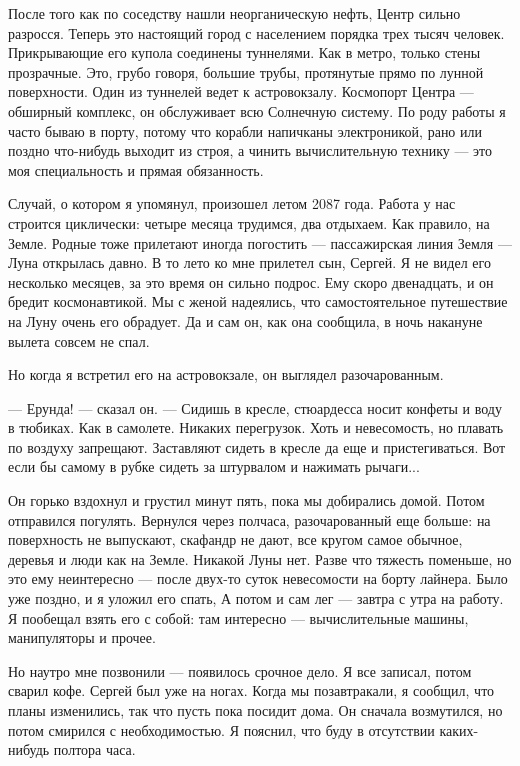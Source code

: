 \documentclass[11pt,a4paper,oneside]{article}
\begin{document}
После того как по соседству нашли неорганическую нефть, Центр сильно разросся. Теперь это настоящий город с населением порядка трех тысяч человек. Прикрывающие его купола соединены туннелями. Как в метро, только стены прозрачные. Это, грубо говоря, большие трубы, протянутые прямо по лунной поверхности. Один из туннелей ведет к астровокзалу. Космопорт Центра — обширный комплекс, он обслуживает всю Солнечную систему. По роду работы я часто бываю в порту, потому что корабли напичканы электроникой, рано или поздно что-нибудь выходит из строя, а чинить вычислительную технику — это моя специальность и прямая обязанность.

Случай, о котором я упомянул, произошел летом 2087 года. Работа у нас строится циклически: четыре месяца трудимся, два отдыхаем. Как правило, на Земле. Родные тоже прилетают иногда погостить — пассажирская линия Земля — Луна открылась давно. В то лето ко мне прилетел сын, Сергей. Я не видел его несколько месяцев, за это время он сильно подрос. Ему скоро двенадцать, и он бредит космонавтикой. Мы с женой надеялись, что самостоятельное путешествие на Луну очень его обрадует. Да и сам он, как она сообщила, в ночь накануне вылета совсем не спал.

Но когда я встретил его на астровокзале, он выглядел разочарованным.

— Ерунда! — сказал он. — Сидишь в кресле, стюардесса носит конфеты и воду в тюбиках. Как в самолете. Никаких перегрузок. Хоть и невесомость, но плавать по воздуху запрещают. Заставляют сидеть в кресле да еще и пристегиваться. Вот если бы самому в рубке сидеть за штурвалом и нажимать рычаги...

Он горько вздохнул и грустил минут пять, пока мы добирались домой. Потом отправился погулять. Вернулся через полчаса, разочарованный еще больше: на поверхность не выпускают, скафандр не дают, все кругом самое обычное, деревья и люди как на Земле. Никакой Луны нет. Разве что тяжесть поменьше, но это ему неинтересно — после двух-то суток невесомости на борту лайнера. Было уже поздно, и я уложил его спать, А потом и сам лег — завтра с утра на работу. Я пообещал взять его с собой: там интересно — вычислительные машины, манипуляторы и прочее.

Но наутро мне позвонили — появилось срочное дело. Я все записал, потом сварил кофе. Сергей был уже на ногах. Когда мы позавтракали, я сообщил, что планы изменились, так что пусть пока посидит дома. Он сначала возмутился, но потом смирился с необходимостью. Я пояснил, что буду в отсутствии каких- нибудь полтора часа.
\end{document}

